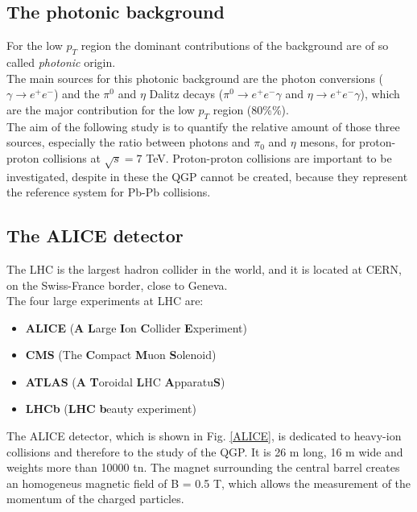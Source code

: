 \documentclass[a4paper,twocolumn,gsifonts,twoside]{gsipaper}
\begin{document}
\subsection{The photonic background}
\label{section:photonic}
For the low $p_{T}$ region the dominant contributions of the background are of so called \textit{photonic} origin. \\
The main sources for this photonic background are the photon conversions ($\gamma\rightarrow e^{+}e^{-}$) and the $\pi^{0}$ and $\eta$
Dalitz decays ($\pi^{0} \rightarrow e^{+}e^{-}\gamma$ and $\eta \rightarrow e^{+}e^{-}\gamma$), which are the major contribution
for the low $p_{T}$ region (80\%\textdiv {}\%). \\

The aim of the following study is to quantify the relative amount of those three sources, especially the ratio between photons and 
$\pi_{0}$ and $\eta$ mesons, for proton-proton collisions at $\sqrt{s} = 7$ TeV. Proton-proton collisions are important to be 
investigated, despite in these the QGP cannot be created, because they represent the reference system for Pb-Pb collisions.

\subsection{The ALICE detector}
The LHC is the largest hadron collider in the world, and it is located at CERN, on the Swiss-France border, close to Geneva.\\
The four large experiments at LHC are:
\begin{itemize}
 \item \textbf{ALICE} (\textbf{A} \textbf{L}arge \textbf{I}on \textbf{C}ollider \textbf{E}xperiment)
 \item \textbf{CMS} (The \textbf{C}ompact \textbf{M}uon \textbf{S}olenoid)
 \item \textbf{ATLAS} (\textbf{A} \textbf{T}oroidal \textbf{L}HC \textbf{A}pparatu\textbf{S})
 \item \textbf{LHCb} (\textbf{LHC} \textbf{b}eauty experiment)
\end{itemize}

The ALICE detector, which is shown in Fig. \ref{ALICE}, is dedicated to heavy-ion collisions and therefore to the study of the QGP.
It is 26 m long, 16 m wide and weights more than 10000 tn. The magnet surrounding the central barrel creates an homogeneus magnetic 
field of B = 0.5 T, which allows the measurement of the momentum of the charged particles.\\
\end{document}

